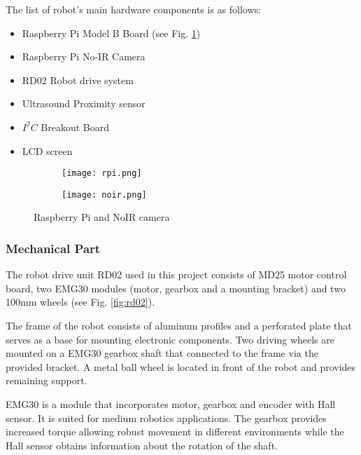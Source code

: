 The list of robot's main hardware components is as follows:

\begin{itemize}
  \item Raspberry Pi Model B Board (see Fig. \ref{fig:rpi_board})
  \item Raspberry Pi No-IR Camera
  \item RD02 Robot drive system
  \item Ultrasound Proximity sensor
  \item $I^2C$ Breakout Board
  \item LCD screen
\end{itemize}

\begin{figure}[h!]
\centering 

	\begin{subfigure}[h]{0.35\textwidth}
		\centering
			\texttt{[image: rpi.png]}
			\label{fig:rpi_board}
	\end{subfigure}
	\begin{subfigure}[h]{0.35\textwidth}
		\centering
			\texttt{[image: noir.png]}
			\label{fig:rpi_noir}
	\end{subfigure}

\caption{Raspberry Pi and NoIR camera}
\label{fig:rpi}
\end{figure}

\subsubsection{Mechanical Part} 

The robot drive unit RD02 used in this project consists of MD25 motor control
board, two EMG30 modules (motor, gearbox and a mounting bracket) and two 100mm
wheels (see Fig. \ref{fig:rd02}).

The frame of the robot consists of aluminum profiles and a perforated plate that
serves as a base for mounting electronic components. Two driving wheels
are mounted on a EMG30 gearbox shaft that connected to the frame via the
provided bracket. A metal ball wheel is located in front of the robot and
provides remaining support.

EMG30 is a module that incorporates motor, gearbox and encoder with Hall sensor.
It is suited for medium robotics applications. The gearbox provides increased
torque allowing robust movement in different environments while the Hall sensor
obtains information about the rotation of the shaft.

